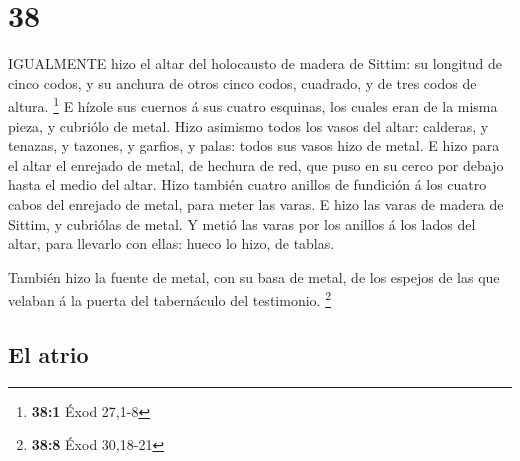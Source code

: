 \hypertarget{section-37}{%
\section{38}\label{section-37}}

 IGUALMENTE hizo el altar del holocausto de madera de
Sittim: su longitud de cinco codos, y su anchura de otros cinco codos,
cuadrado, y de tres codos de altura. \footnote{\textbf{38:1} Éxod 27,1-8}
 E hízole sus cuernos á sus cuatro esquinas, los cuales eran
de la misma pieza, y cubriólo de metal.  Hizo asimismo todos
los vasos del altar: calderas, y tenazas, y tazones, y garfios, y palas:
todos sus vasos hizo de metal.  E hizo para el altar el
enrejado de metal, de hechura de red, que puso en su cerco por debajo
hasta el medio del altar.  Hizo también cuatro anillos de
fundición á los cuatro cabos del enrejado de metal, para meter las
varas.  E hizo las varas de madera de Sittim, y cubriólas de
metal.  Y metió las varas por los anillos á los lados del
altar, para llevarlo con ellas: hueco lo hizo, de tablas.

 También hizo la fuente de metal, con su basa de metal, de
los espejos de las que velaban á la puerta del tabernáculo del
testimonio. \footnote{\textbf{38:8} Éxod 30,18-21}

\hypertarget{el-atrio}{%
\subsection{El atrio}\label{el-atrio}}

